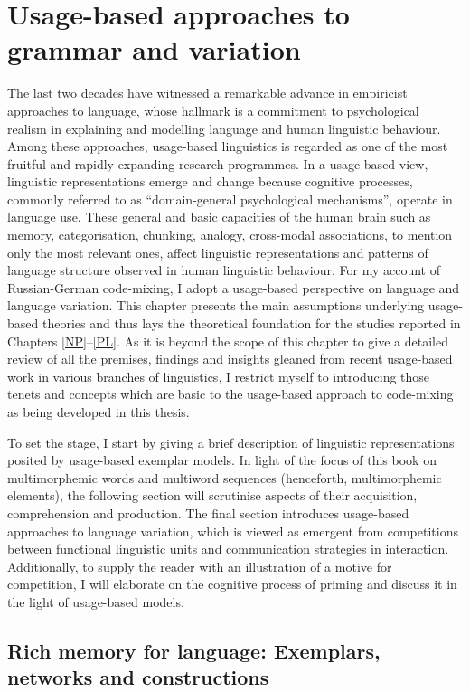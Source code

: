 \chapter{Usage-based approaches to grammar and variation}\label{UBL}

The last two decades have witnessed a remarkable advance in empiricist approaches to language, whose hallmark is a commitment to psychological realism in explaining and modelling language and human linguistic behaviour. Among these approaches, usage-based linguistics is regarded as one of the most fruitful and rapidly expanding research programmes. In a usage-based view, linguistic representations emerge and change because cognitive processes, commonly referred to as “domain-general psychological mechanisms”, operate in language use. These general and basic capacities of the human brain such as memory, categorisation, chunking, analogy, cross-modal associations, to mention only the most relevant ones, affect linguistic representations and patterns of language structure observed in human linguistic behaviour. For my account of Russian-German code-mixing, I adopt a usage-based perspective on language and language variation. This chapter presents the main assumptions underlying usage-based theories and thus lays the theoretical foundation for the studies reported in Chapters \ref{NP}--\ref{PL}. As it is beyond the scope of this chapter to give a detailed review of all the premises, findings and insights gleaned from recent usage-based work in various branches of linguistics, I restrict myself to introducing those tenets and concepts  which are basic to the usage-based approach to code-mixing as being developed in this thesis. 

To set the stage, I start by giving a brief description of linguistic representations posited by usage-based exemplar models. In light of the focus of this book on multimorphemic words and multiword sequences (henceforth, multimorphemic elements), the following section will scrutinise aspects of their acquisition, comprehension and production. The final section introduces usage-based approaches to language variation, which is viewed as emergent from competitions between functional linguistic units and communication strategies in interaction. Additionally, to supply the reader with an illustration of a motive for competition, I will elaborate on the cognitive process of priming and discuss it in the light of usage-based models.

\section{Rich memory for language: Exemplars, networks and constructions}
\label{sec:exemplars}

